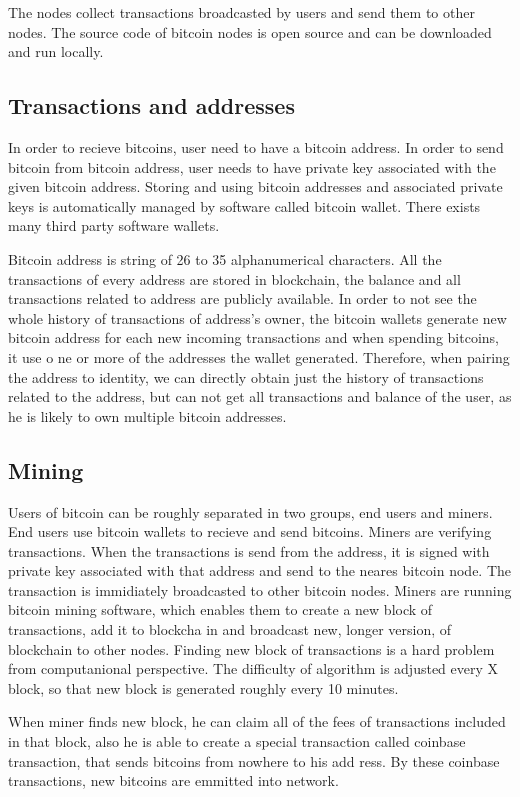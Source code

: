 \documentclass[
  digital, %
  table,   %
  lof,     %
  lot,     %
  oneside
]{fithesis3}
\begin{document}
The nodes collect transactions broadcasted by users and send them to other nodes.
The source code of bitcoin nodes is open source and can be downloaded and run locally. 

\subsection{Transactions and addresses}
In order to recieve bitcoins, user need to have a bitcoin address. In order to send bitcoin from bitcoin address,
 user needs to have private key associated with the given bitcoin address.
Storing and using bitcoin addresses and associated private keys is automatically managed
by software called bitcoin wallet. There exists many third party software wallets.

Bitcoin address is string of 26 to 35 alphanumerical characters.
All the transactions of every address are stored in blockchain, the balance and all transactions related to address are
publicly available.
In order to not see the whole history of transactions of address's owner,
the bitcoin wallets generate new bitcoin address for each new incoming transactions and when spending bitcoins, it use o
ne or more of the addresses the wallet generated.
Therefore, when pairing the address to identity, we can directly obtain just the history of transactions related to the 
address,
but can not get all transactions and balance of the user, as he is likely to own multiple bitcoin addresses.

\subsection{Mining}
Users of bitcoin can be roughly separated in two groups, end users and miners.
End users use bitcoin wallets to recieve and send bitcoins.
Miners are verifying transactions. When the transactions is send from the address, 
it is signed with private key associated with that address and send to the neares bitcoin node.
The transaction is immidiately broadcasted to other bitcoin nodes.
Miners are running bitcoin mining software, which enables them to create a new block of transactions, add it to blockcha
in
and broadcast new, longer version, of blockchain to other nodes.
Finding new block of transactions is a hard problem from computanional perspective.
The difficulty of algorithm is adjusted every X block, so that new block is generated roughly every 10 minutes.

When miner finds new block, he can claim all of the fees of transactions included in that block,
also he is able to create a special transaction called coinbase transaction, that sends bitcoins from nowhere to his add
ress.
By these coinbase transactions, new bitcoins are emmitted into network.
\end{document}
